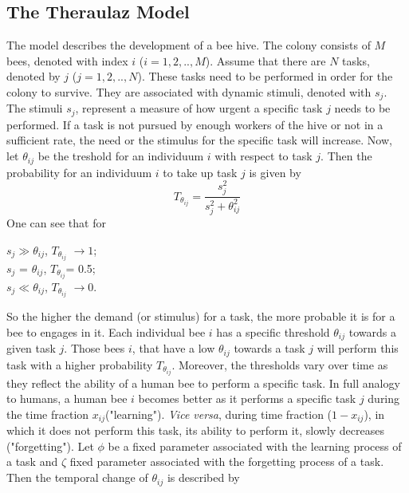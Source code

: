 
\subsection{The Theraulaz Model}
The model describes the development of a bee hive. The colony consists of $M$ bees, denoted with index $i$ ($i=1,2,..,M$). Assume that there are $N$ tasks, denoted by $j$ ($j=1,2,..,N$). These tasks need to be performed in order for the colony to survive. They are associated with dynamic stimuli, denoted with $s_{j}$. The stimuli $s_{j}$, represent a measure of how urgent a specific task $j$ needs to be performed. If a task is not pursued by enough workers of the hive or not in a sufficient rate, the need or the stimulus for the specific task will increase. Now, let $\theta_{ij}$ be the treshold for an individuum $i$ with respect to task $j$. Then the probability for an individuum $i$ to take up task $j$ is given by
\begin{equation} 
T_{\theta_{ij}}=\frac{s^{2}_{j}}{s^{2}_{j}+\theta^{2}_{ij}}
\end{equation}
One can see that for 
\begin{center}
$s_{j} \gg \theta_{ij}$, $T_{\theta_{ij}}$ $\to 1$; \\
$s_{j}$ = $\theta_{ij} $, $T_{\theta_{ij}}$= 0.5; \\
$s_{j} \ll \theta_{ij}$,  $T_{\theta_{ij}}$ $\to 0$.

\end{center}
 So the higher the demand (or stimulus) for a task, the more probable it is for a bee to engages in it. Each individual bee $i$ has a specific threshold $\theta_{ij}$ towards a given task $j$. Those bees $i$, that have a low $\theta_{ij}$ towards a task $j$ will perform this task with a higher probability $T_{\theta_{ij}}$. Moreover, the thresholds vary over time as they reflect the ability of a human bee to perform a specific task. In full analogy to humans, a human bee $i$ becomes better as it performs a specific task $j$ during the time fraction $x_{ij}$("learning"). \textit{Vice versa}, during time fraction ($1-x_{ij}$), in which it does not perform this task, its ability to perform it, slowly decreases ("forgetting"). Let $\phi$ be a fixed parameter associated with the learning process of a task and $\zeta$  fixed parameter associated with the forgetting process of a task. Then the temporal change of $\theta_{ij}$ is described by

